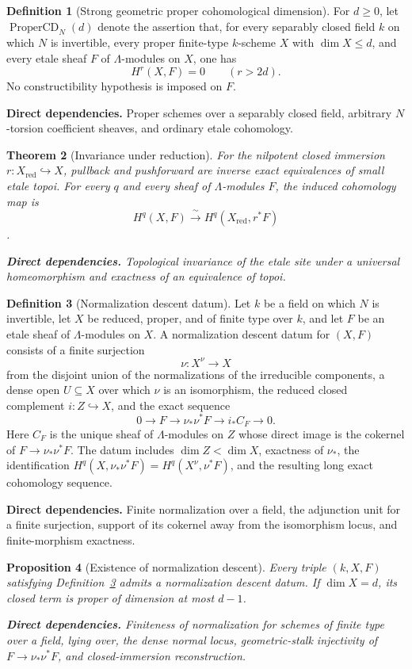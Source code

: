 \documentclass[10pt]{article}
\newtheorem{theorem}{Theorem}[section]
\newtheorem{proposition}[theorem]{Proposition}
\theoremstyle{definition}
\newtheorem{definition}[theorem]{Definition}
\newcommand{\deps}[1]{\par\smallskip\noindent\textbf{Direct dependencies.} #1}
\begin{document}
\begin{definition}[Strong geometric proper cohomological dimension]
\label{def:proper-cd}
For $d\geq0$, let $\operatorname{ProperCD}_N(d)$ denote the assertion that,
for every separably closed field $k$ on which $N$ is invertible, every proper
finite-type $k$-scheme $X$ with $\dim X\leq d$, and every etale sheaf $F$ of
$\Lambda$-modules on $X$, one has
\[
 H^r(X,F)=0\qquad(r>2d).
\]
No constructibility hypothesis is imposed on $F$.
\deps{Proper schemes over a separably closed field, arbitrary
$N$-torsion coefficient sheaves, and ordinary etale cohomology.}
\end{definition}

\begin{theorem}[Invariance under reduction]
\label{thm:reduction-etale}
For the nilpotent closed immersion
$r:X_{\mathrm{red}}\hookrightarrow X$, pullback and pushforward are inverse
exact equivalences of small etale topoi.  For every $q$ and every sheaf of
$\Lambda$-modules $F$, the induced cohomology map is
\[
 H^q(X,F)\xrightarrow{\ \sim\ }
 H^q(X_{\mathrm{red}},r^*F)
\].
\deps{Topological invariance of the etale site under a universal
homeomorphism and exactness of an equivalence of topoi.}
\end{theorem}

\begin{definition}[Normalization descent datum]
\label{def:normalization-descent}
Let $k$ be a field on which $N$ is invertible, let $X$ be reduced, proper,
and of finite type over $k$, and let $F$ be an etale sheaf of
$\Lambda$-modules on $X$.  A normalization descent datum for $(X,F)$ consists
of a finite surjection
\[
 \nu:X^\nu\longrightarrow X
\]
from the disjoint union of the normalizations of the irreducible components,
a dense open $U\subseteq X$ over which $\nu$ is an isomorphism, the reduced
closed complement $i:Z\hookrightarrow X$, and the exact sequence
\[
 0\longrightarrow F\longrightarrow\nu_*\nu^*F
 \longrightarrow i_*C_F\longrightarrow0.
\]
Here $C_F$ is the unique sheaf of $\Lambda$-modules on $Z$ whose direct image
is the cokernel of $F\to\nu_*\nu^*F$.
The datum includes $\dim Z<\dim X$, exactness of $\nu_*$, the identification
$H^q(X,\nu_*\nu^*F)=H^q(X^\nu,\nu^*F)$, and the resulting long exact
cohomology sequence.
\deps{Finite normalization over a field, the adjunction unit for a finite
surjection, support of its cokernel away from the isomorphism locus, and
finite-morphism exactness.}
\end{definition}

\begin{proposition}[Existence of normalization descent]
\label{prop:normalization-descent}
Every triple $(k,X,F)$ satisfying
Definition~\ref{def:normalization-descent} admits a normalization descent
datum.  If $\dim X=d$, its closed term is proper of dimension at most $d-1$.
\deps{Finiteness of normalization for schemes of finite type over a field,
lying over, the dense normal locus, geometric-stalk injectivity of
$F\to\nu_*\nu^*F$, and closed-immersion reconstruction.}
\end{proposition}
\end{document}
